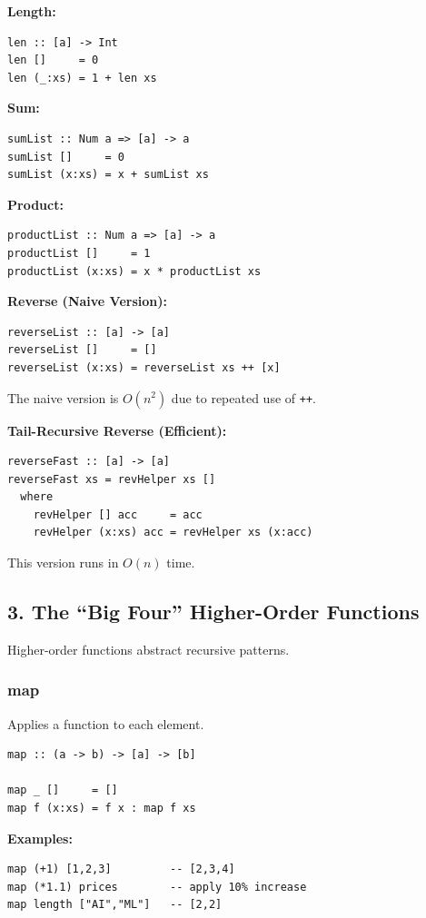 \documentclass[12pt]{article}
\begin{document}
\textbf{Length:}
\begin{verbatim}
len :: [a] -> Int
len []     = 0
len (_:xs) = 1 + len xs
\end{verbatim}

\textbf{Sum:}
\begin{verbatim}
sumList :: Num a => [a] -> a
sumList []     = 0
sumList (x:xs) = x + sumList xs
\end{verbatim}

\textbf{Product:}
\begin{verbatim}
productList :: Num a => [a] -> a
productList []     = 1
productList (x:xs) = x * productList xs
\end{verbatim}

\textbf{Reverse (Naive Version):}
\begin{verbatim}
reverseList :: [a] -> [a]
reverseList []     = []
reverseList (x:xs) = reverseList xs ++ [x]
\end{verbatim}

The naive version is $O(n^2)$ due to repeated use of \texttt{++}.

\textbf{Tail-Recursive Reverse (Efficient):}
\begin{verbatim}
reverseFast :: [a] -> [a]
reverseFast xs = revHelper xs []
  where
    revHelper [] acc     = acc
    revHelper (x:xs) acc = revHelper xs (x:acc)
\end{verbatim}

This version runs in $O(n)$ time.

\subsection{3. The ``Big Four'' Higher-Order Functions}

Higher-order functions abstract recursive patterns.

\subsubsection{map}

Applies a function to each element.

\begin{verbatim}
map :: (a -> b) -> [a] -> [b]

map _ []     = []
map f (x:xs) = f x : map f xs
\end{verbatim}

\textbf{Examples:}
\begin{verbatim}
map (+1) [1,2,3]         -- [2,3,4]
map (*1.1) prices        -- apply 10% increase
map length ["AI","ML"]   -- [2,2]
\end{verbatim}
\end{document}
